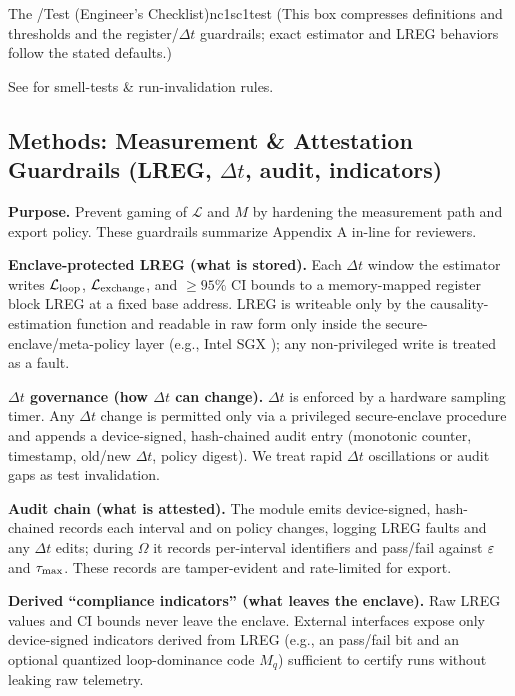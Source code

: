 \documentclass[11pt]{article}
\begin{document}
\begin{docbox}{The \NC/\SC Test (Engineer's Checklist)}{nc1sc1test}
(This box compresses  definitions and thresholds and the  register/$\Delta t$ guardrails; exact estimator and LREG behaviors follow the stated defaults.)

See  for smell-tests \& run-invalidation rules.
\end{docbox}

\subsection{Methods: Measurement \& Attestation Guardrails (LREG, $\Delta t$, audit, indicators)}
\label{sec:method_guardrails}

\textbf{Purpose.} Prevent gaming of $\mathcal{L}$ and $M$ by hardening the measurement path and export policy. These guardrails summarize Appendix A in-line for reviewers.

\textbf{Enclave-protected LREG (what is stored).} Each $\Delta t$ window the estimator writes $\mathcal{L}_{\text{loop}}$, $\mathcal{L}_{\text{exchange}}$, and $\geq 95\%$ CI bounds to a memory-mapped register block LREG at a fixed base address. LREG is writeable only by the causality-estimation function and readable in raw form only inside the secure-enclave/meta-policy layer (e.g., Intel SGX \cite{costan2016intel}); any non-privileged write is treated as a fault.

\textbf{$\Delta t$ governance (how $\Delta t$ can change).} $\Delta t$ is enforced by a hardware sampling timer. Any $\Delta t$ change is permitted only via a privileged secure-enclave procedure and appends a device-signed, hash-chained audit entry (monotonic counter, timestamp, old/new $\Delta t$, policy digest). We treat rapid $\Delta t$ oscillations or audit gaps as test invalidation.

\textbf{Audit chain (what is attested).} The module emits device-signed, hash-chained records \cite{haber1991time,merkle1988digital} each interval and on policy changes, logging LREG faults and any $\Delta t$ edits; during $\Omega$ it records per-interval identifiers and pass/fail against $\varepsilon$ and $\tau_{\max}$. These records are tamper-evident and rate-limited for export.

\textbf{Derived ``compliance indicators'' (what leaves the enclave).} Raw LREG values and CI bounds never leave the enclave. External interfaces expose only device-signed indicators derived from LREG (e.g., an \NC pass/fail bit and an optional quantized loop-dominance code $M_q$) sufficient to certify runs without leaking raw telemetry.
\end{document}
